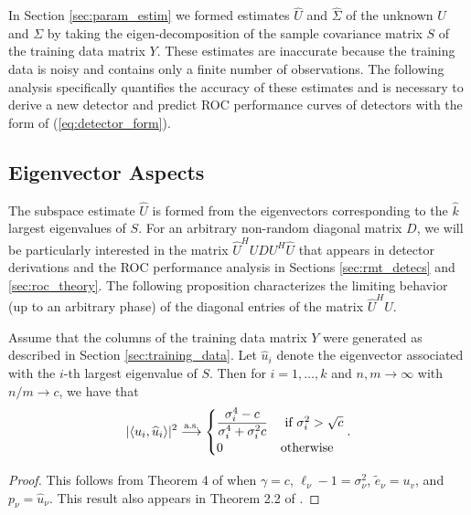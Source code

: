 In Section \ref{sec:param_estim} we formed estimates $\widehat{U}$ and $\widehat{\Sigma}$ of the unknown $U$ and $\Sigma$ by taking the eigen-decomposition of the sample covariance matrix $S$ of the training data matrix $Y$. These estimates are inaccurate because the training data is noisy and contains only a finite number of observations. The following analysis specifically quantifies the accuracy of these estimates and is necessary to derive a new detector and predict ROC performance curves of detectors with the form of (\ref{eq:detector_form}).

\subsection{Eigenvector Aspects}\label{sec:eigvect_aspects}

The subspace estimate $\widehat{U}$ is formed from the eigenvectors corresponding to the $\widehat{k}$ largest eigenvalues of $S$. For an arbitrary non-random diagonal matrix $D$, we will be particularly interested in the matrix $\widehat{U}^HUDU^H\widehat{U}$ that appears in detector derivations and the ROC performance analysis in Sections \ref{sec:rmt_detecs} and \ref{sec:roc_theory}. The following proposition characterizes the limiting behavior (up to an arbitrary phase) of the diagonal entries of the matrix $\widehat{U}^HU$.

\begin{prop}\label{th:angles}
Assume that the columns of the training data matrix $Y$ were generated as described in Section \ref{sec:training_data}. Let $\widehat{u}_{i}$ denote the eigenvector associated with the $i$-th largest eigenvalue of $S$. Then for $i = 1, \ldots, k$ and $n, m \longrightarrow \infty$ with $n/m \to c$, we have that
\begin{equation}\label{eq:angles}
|\langle u_i,\widehat{u}_i\rangle|^2 \convas
\begin{cases}
\dfrac{\sigma_i^4-c}{\sigma_{i}^4+\sigma_{i}^2c} & \text{ if } \sigma_{i}^2>\sqrt{c}\\
0 & \textrm{otherwise}\\
\end{cases}.
\end{equation}
\end{prop}
\begin{proof}
This follows from Theorem 4 of \cite{paul2007asymptotics} when $\gamma=c$, $\ell_\nu-1=\sigma_\nu^2$, $\widetilde{e}_\nu=u_v$, and $p_\nu=\widehat{u}_\nu$. This result also appears in Theorem 2.2 of \cite{benaych2011eigenvalues}.
\end{proof}

